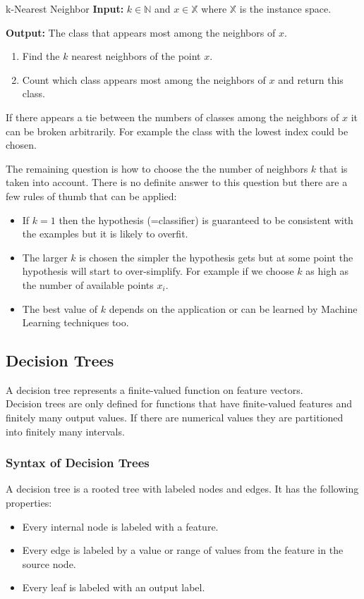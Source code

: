 \documentclass{panikzettel}
\begin{document}
\begin{algo}{k-Nearest Neighbor}
\textbf{Input:} $k\in\mathbb{N}$ and $x\in \mathbb{X}$ where $\mathbb{X}$ is the instance space.

\textbf{Output:} The class that appears most among the neighbors of $x$.
\tcblower
\begin{enumerate}
\item Find the $k$ nearest neighbors of the point $x$.
\item Count which class appears most among the neighbors of $x$ and return this class.
\end{enumerate}
\end{algo}

If there appears a tie between the numbers of classes among the neighbors of $x$ it can be broken arbitrarily. For example the class with the lowest index could be chosen.

The remaining question is how to choose the the number of neighbors $k$ that is taken into account. There is no definite answer to this question but there are a few rules of thumb that can be applied:
\begin{itemize}
\item If $k=1$ then the hypothesis (=classifier) is guaranteed to be consistent with the examples but it is likely to overfit.
\item The larger $k$ is chosen the simpler the hypothesis gets but at some point the hypothesis will start to over-simplify. For example if we choose $k$ as high as the number of available points $x_i$.
\item The best value of $k$ depends on the application or can be learned by Machine Learning techniques too.
\end{itemize}


\subsection{Decision Trees}
\label{syntax_dec_trees}
A decision tree represents a finite-valued function on feature vectors.\\
Decision trees are only defined for functions that have finite-valued features and finitely many output values. If there are numerical values they are partitioned into finitely many intervals.

\subsubsection{Syntax of Decision Trees}
A decision tree is a rooted tree with labeled nodes and edges. It has the following properties:
\begin{itemize}
\item Every internal node is labeled with a feature.
\item Every edge is labeled by a value or range of values from the feature in the source node.
\item Every leaf is labeled with an output label.
\end{itemize}
\end{document}
